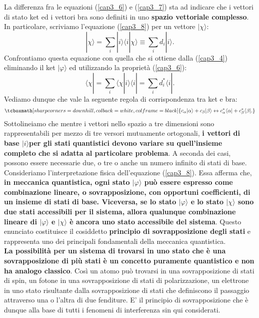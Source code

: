 La differenza fra le equazioni (\ref{cap3_6}) e (\ref{cap3_7}) sta ad indicare che i vettori di stato ket ed i vettori bra sono definiti in uno \textbf{spazio vettoriale complesso}. In particolare, scriviamo l'equazione (\ref{cap3_8}) per un vettore $| \chi\rangle$:
	\begin{equation}
		| \chi \rangle = \sum \limits_{i} | i \rangle \langle i | \chi \rangle \equiv \sum \limits_{i} d_i | i \rangle .
	\end{equation}
Confrontiamo questa equazione con quella che si ottiene dalla (\ref{cap3_4}) eliminando il ket $| \varphi \rangle$ ed utilizzando la proprietà (\ref{cap3_6}):
	\begin{equation}
		\langle \chi | =\sum \limits_{i} \langle \chi | i \rangle \langle i | = \sum \limits_{i} d^*_i \langle i | .
	\end{equation}
Vediamo dunque che vale la seguente regola di corrispondenza tra ket e bra:
	\begin{equation}
		\tcboxmath[sharp corners=downhill, colback=white, colframe=black]{
			c_{\alpha}| \alpha \rangle +c_{\beta} | \beta \rangle  \leftrightarrow c^*_{\alpha}\langle \alpha | +c^*_{\beta}\langle \beta | .
			}
	\end{equation}
Sottolineiamo che mentre i vettori nello spazio a tre dimensioni sono rappresentabili per mezzo di tre versori mutuamente ortogonali, \textbf{i vettori di base $| i \rangle $per gli stati quantistici devono variare su quell'insieme completo che si adatta al particolare problema}. A seconda dei casi, possono essere necessarie due, o tre o anche un numero infinito di stati di base.\\

Consideriamo l'interpretazione fisica dell'equazione (\ref{cap3_8}). Essa afferma che, \textbf{in meccanica quantistica, ogni stato $| \varphi \rangle$ può essere espresso come combinazione lineare, o sovrapposizione, con opportuni coefficienti, di un insieme di stati di base. Viceversa, se lo stato $| \varphi \rangle$ e lo stato $| \chi \rangle$ sono due stati accessibili per il sistema, allora qualunque combinazione lineare di $| \varphi \rangle$ e $| \chi \rangle$ è ancora uno stato accessibile del sistema}. Questo enunciato costituisce il cosiddetto \textbf{principio di sovrapposizione degli stati} e rappresenta uno dei principali fondamentali della meccanica quantistica.\\

\textbf{La possibilità per un sistema di trovarsi in uno stato che è una sovrapposizione di più stati è un concetto puramente quantistico e non ha analogo classico}. Così un atomo può trovarsi in una sovrapposizione di stati di spin, un fotone in una sovrapposizione di stati di polarizzazione, un elettrone in uno stato risultante dalla sovrapposizione di stati che definiscono il passaggio attraverso una o l'altra di due fenditure. E' il principio di sovrapposizione che è dunque alla base di tutti i fenomeni di interferenza sin qui considerati.\\

